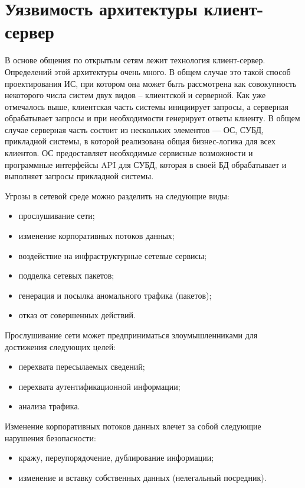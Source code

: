 \section{Уязвимость архитектуры клиент-сервер} 

В основе общения по открытым сетям лежит технология клиент-сервер. Определений
этой архитектуры очень много. В общем случае это такой способ проектирования ИС,
при котором она может быть рассмотрена как совокупность некоторого числа систем
двух видов -- клиентской и серверной.
Как уже отмечалось выше, клиентская часть системы инициирует запросы, а
серверная обрабатывает запросы и при необходимости генерирует ответы клиенту. В
общем случае серверная часть состоит из нескольких элементов --- ОС, СУБД,
прикладной системы, в которой реализована общая бизнес-логика для всех клиентов.
ОС предоставляет необходимые сервисные возможности и программные интерфейсы API
для СУБД, которая в своей БД обрабатывает и выполняет запросы прикладной
системы.~\cite{ComputerWeek}

Угрозы в сетевой среде можно разделить на следующие виды:
\begin{itemize}
  \item прослушивание сети;
  \item изменение корпоративных потоков данных;
  \item воздействие на инфраструктурные сетевые сервисы;
  \item подделка сетевых пакетов;
  \item генерация и посылка аномального трафика (пакетов);
  \item отказ от совершенных действий.
\end{itemize}
	
Прослушивание сети может предприниматься злоумышленниками для достижения следующих целей:
\begin{itemize}
  \item перехвата пересылаемых сведений;
  \item перехвата аутентификационной информации;
  \item анализа трафика.
\end{itemize}
	
Изменение корпоративных потоков данных влечет за собой следующие нарушения
безопасности:
\begin{itemize}
  \item кражу, переупорядочение, дублирование информации;
  \item изменение и вставку собственных данных (нелегальный посредник).
\end{itemize}
	
